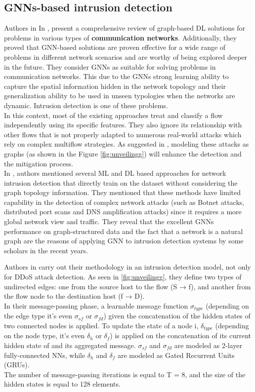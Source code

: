 \subsection{GNNs-based intrusion detection}
Authors in In \cite{gnnIntrisionDetection1}, present a comprehensive review of graph-based DL solutions for problems in various types of \textbf{communication networks}. Additionally, they proved that GNN-based solutions are proven effective for a wide range of problems in different network scenarios and are worthy of being explored deeper in the future. They consider GNNs as suitable for solving problems in communication networks. This due to the GNNs strong learning ability to capture the spatial information hidden in the network topology and their generalization ability to be used in unseen typologies when the networks are dynamic. Intrusion detection is one of these problems.\\
In this context, most of the existing approaches treat and classify a flow independently using its specific features. They also ignore its relationship with other flows that is not properly adapted to numerous real-world attacks which rely on complex multiflow strategies. As suggested in \cite{unveiling}, modeling these attacks as graphs (as shown in the Figure \ref{fig:unveilingg}) will enhance the detection and the mitigation process. \\
In \cite{gnnIntrisionDetection2}, authors mentioned several ML and DL based approaches for network intrusion detection that directly train on the dataset without considering the graph topology information. They mentioned that these methods have limited capability in the detection of complex network attacks (such as Botnet attacks, distributed port scans and DNS amplification attacks) since it requires a more global network view and traffic. They reveal that the excellent GNNs performance on graph-structured data and the fact that a network is a natural graph are the reasons of applying GNN to intrusion detection systems by  some scholars in the recent years. 

Authors in \cite{unveiling} carry out their methodology in an intrusion detection model, not only for DDoS attack detection. As seen in \ref{fig:unveilingg}, they define two types of undirected edges: one from the source host to the flow (S → f), and another from the flow node to the destination host (f → D). \\
In their message-passing phase, a learnable message function $\sigma_{type}$ (depending on the edge type it’s even $\sigma_{sf}$ or $\sigma_{fd}$) given the concatenation of the hidden states of two connected nodes is applied. To update the state of a node i, $\delta_{type}$ (depending on  the node type, it’s even $\delta_{h}$ or $\delta_{f}$) is applied on the concatenation of its current hidden state of and its aggregated message. $\sigma_{sf}$ and $\sigma_{fd}$ are modeled as 2-layer fully-connected NNs, while $\delta_{h}$ and $\delta_{f}$ are modeled as Gated Recurrent Units (GRUs).\\
The number of message-passing iterations is equal to T = 8, and the size of the hidden states is equal to 128 elements.

